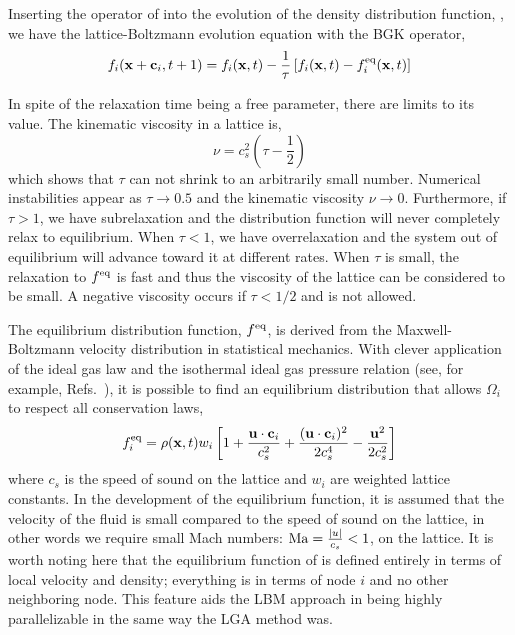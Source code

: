 Inserting the operator of  into the evolution of the density distribution function, , we have the lattice-Boltzmann evolution equation with the BGK operator,
\begin{equation}\label{eq:lbm-bgk}
	f_i(\mathbf{x}+\mathbf{c}_i, t + 1) = f_i(\mathbf{x},t) - \frac{1}{\tau}\left[f_i(\mathbf{x},t) - f_i^{\text{eq}}(\mathbf{x},t)\right]
\end{equation}

In spite of the relaxation time being a free parameter, there are limits to its value. The kinematic viscosity in a lattice is,
\begin{equation}\label{eq:lbm-viscosity-relaxation-time}
	\nu = c_s^2\left(\tau-\frac{1}{2}\right)
\end{equation}
which shows that $\tau$ can not shrink to an arbitrarily small number. Numerical instabilities appear as $\tau \rightarrow 0.5$ and the kinematic viscosity $\nu \rightarrow 0$. Furthermore, if $\tau > 1$, we have subrelaxation and the distribution function will never completely relax to equilibrium. When $\tau < 1$, we have overrelaxation and the system out of equilibrium will advance toward it at different rates. When $\tau$ is small, the relaxation to $f^{\text{eq}}$ is fast and thus the viscosity of the lattice can be considered to be small. A negative viscosity occurs if $\tau < 1/2$ and is not allowed.\cite{Chopard2002,Chen1998a}

The equilibrium distribution function, $f^{\text{eq}}$, is derived from the Maxwell-Boltzmann velocity distribution in statistical mechanics. With clever application of the ideal gas law and the isothermal ideal gas pressure relation (see, for example, Refs.~\cite{Viggen2009,Chopard2002}), it is possible to find an equilibrium distribution that allows $\Omega_i$ to respect all conservation laws,
\begin{equation}\label{eq:equilib-dist-function}
	f_i^{\text{eq}} = \rho(\mathbf{x},t)w_i\left[1+\frac{\mathbf{u}\cdot\mathbf{c}_i}{c_s^2} + \frac{(\mathbf{u}\cdot\mathbf{c}_i)^2}{2c_s^4} - \frac{\mathbf{u}^2}{2c_s^2} \right]
\end{equation}
where $c_s$ is the speed of sound on the lattice and $w_i$ are weighted lattice constants. In the development of the equilibrium function, it is assumed that the velocity of the fluid is small compared to the speed of sound on the lattice, in other words we require small Mach numbers: $\mathrm{Ma} = \frac{|u|}{c_s} < 1$, on the lattice.\cite{qian1992lattice,Chen1998a} It is worth noting here that the equilibrium function of  is defined entirely in terms of local velocity and density; everything is in terms of node $i$ and no other neighboring node. This feature aids the LBM approach in being highly parallelizable in the same way the LGA method was.

